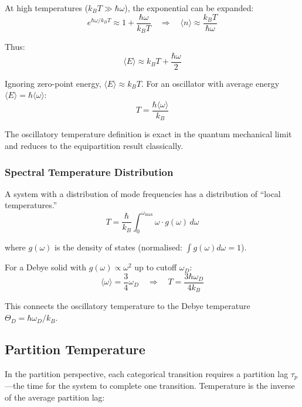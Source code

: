 At high temperatures ($k_B T \gg \hbar\omega$), the exponential can be expanded:
\begin{equation}
e^{\hbar\omega/k_B T} \approx 1 + \frac{\hbar\omega}{k_B T} \quad \Rightarrow \quad \langle n \rangle \approx \frac{k_B T}{\hbar\omega}
\end{equation}

Thus:
\begin{equation}
\langle E \rangle \approx k_B T + \frac{\hbar\omega}{2}
\end{equation}

Ignoring zero-point energy, $\langle E \rangle \approx k_B T$. For an oscillator with average energy $\langle E \rangle = \hbar\langle\omega\rangle$:
\begin{equation}
T = \frac{\hbar\langle\omega\rangle}{k_B}
\end{equation}

The oscillatory temperature definition is exact in the quantum mechanical limit and reduces to the equipartition result classically.



\subsubsection{Spectral Temperature Distribution}

A system with a distribution of mode frequencies has a distribution of ``local temperatures.''
\begin{equation}
T = \frac{\hbar}{k_B} \int_0^{\omega_{\max}} \omega \cdot g(\omega) \, d\omega
\end{equation}

where $g(\omega)$ is the density of states (normalised: $\int g(\omega) d\omega = 1$).

For a Debye solid with $g(\omega) \propto \omega^2$ up to cutoff $\omega_D$:
\begin{equation}
\langle\omega\rangle = \frac{3}{4}\omega_D \quad \Rightarrow \quad T = \frac{3\hbar\omega_D}{4k_B}
\end{equation}

This connects the oscillatory temperature to the Debye temperature $\Theta_D = \hbar\omega_D/k_B$.

\subsection{Partition Temperature}

In the partition perspective, each categorical transition requires a partition lag $\tau_p$—the time for the system to complete one transition. Temperature is the inverse of the average partition lag:

